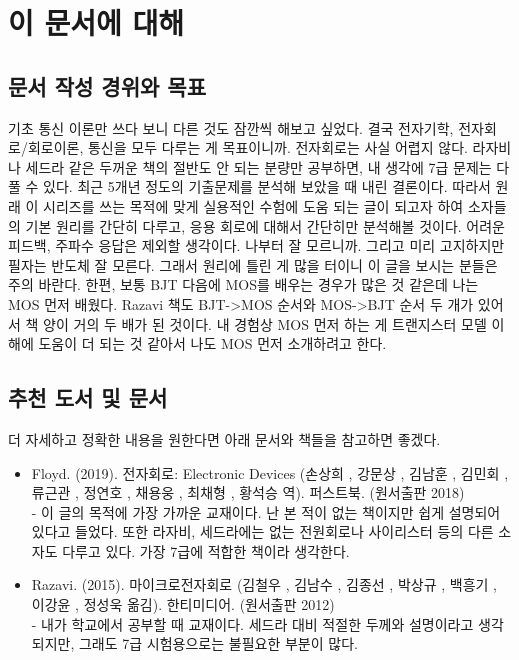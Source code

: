 \chapter{이 문서에 대해}

\section{문서 작성 경위와 목표}
기초 통신 이론만 쓰다 보니 다른 것도 잠깐씩 해보고 싶었다. 결국 전자기학, 전자회로/회로이론, 통신을 모두 다루는 게 목표이니까.
전자회로는 사실 어렵지 않다. 라자비나 세드라 같은 두꺼운 책의 절반도 안 되는 분량만 공부하면, 내 생각에 7급 문제는 다 풀 수 있다.
최근 5개년 정도의 기출문제를 분석해 보았을 때 내린 결론이다.
따라서 원래 이 시리즈를 쓰는 목적에 맞게 실용적인 수험에 도움 되는 글이 되고자 하여 소자들의 기본 원리를 간단히 다루고, 응용 회로에 대해서 간단히만 분석해볼 것이다.
어려운 피드백, 주파수 응답은 제외할 생각이다. 나부터 잘 모르니까.
그리고 미리 고지하지만 필자는 반도체 잘 모른다. 그래서 원리에 틀린 게 많을 터이니 이 글을 보시는 분들은 주의 바란다.
한편, 보통 BJT 다음에 MOS를 배우는 경우가 많은 것 같은데 나는 MOS 먼저 배웠다. Razavi 책도 BJT->MOS 순서와 MOS->BJT 순서 두 개가 있어서 책 양이 거의 두 배가 된 것이다.
내 경험상 MOS 먼저 하는 게 트랜지스터 모델 이해에 도움이 더 되는 것 같아서 나도 MOS 먼저 소개하려고 한다.

\section{추천 도서 및 문서}
더 자세하고 정확한 내용을 원한다면 아래 문서와 책들을 참고하면 좋겠다.
\begin{itemize}
    \item Floyd. (2019). 전자회로: Electronic Devices (손상희 , 강문상 , 김남훈 , 김민회 , 류근관 , 정연호 , 채용웅 , 최채형 , 황석승 역). 퍼스트북. (원서출판 2018) \\
    - 이 글의 목적에 가장 가까운 교재이다. 난 본 적이 없는 책이지만 쉽게 설명되어 있다고 들었다. 또한 라자비, 세드라에는 없는 전원회로나 사이리스터 등의 다른 소자도 다루고 있다. 가장 7급에 적합한 책이라 생각한다.
    \item Razavi. (2015). 마이크로전자회로 (김철우 , 김남수 , 김종선 , 박상규 , 백흥기 , 이강윤 , 정성욱 옮김). 한티미디어. (원서출판 2012)\\
    - 내가 학교에서 공부할 때 교재이다. 세드라 대비 적절한 두께와 설명이라고 생각되지만, 그래도 7급 시험용으로는 불필요한 부분이 많다.
\end{itemize}

